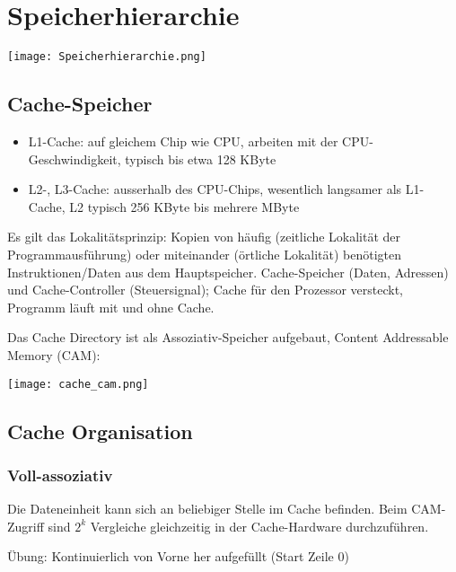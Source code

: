 \section{Speicherhierarchie}

\begin{center}
    \texttt{[image: Speicherhierarchie.png]}
\end{center}

\subsection{Cache-Speicher}

\begin{itemize}
    \itemsep-.5em 
    \item L1-Cache: auf gleichem Chip wie CPU, arbeiten mit der CPU-Geschwindigkeit, typisch bis etwa 128 KByte
    \item L2-, L3-Cache: ausserhalb des CPU-Chips, wesentlich langsamer als L1-Cache, L2 typisch 256 KByte bis mehrere MByte
\end{itemize}

Es gilt das Lokalitätsprinzip: Kopien von häufig (zeitliche Lokalität der Programmausführung) oder miteinander (örtliche Lokalität) benötigten Instruktionen/Daten aus dem Hauptspeicher.
Cache-Speicher (Daten, Adressen) und Cache-Controller (Steuersignal); Cache für den Prozessor versteckt, Programm läuft mit und ohne Cache.

Das Cache Directory ist als Assoziativ-Speicher aufgebaut, Content Addressable Memory (CAM):

\begin{center}
    \texttt{[image: cache\_cam.png]}
\end{center}

\subsection{Cache Organisation}

\subsubsection{Voll-assoziativ}

Die Dateneinheit kann sich an beliebiger Stelle im Cache befinden.
Beim CAM-Zugriff sind $2^k$ Vergleiche gleichzeitig in der Cache-Hardware durchzuführen.

Übung: Kontinuierlich von Vorne her aufgefüllt (Start Zeile 0)

